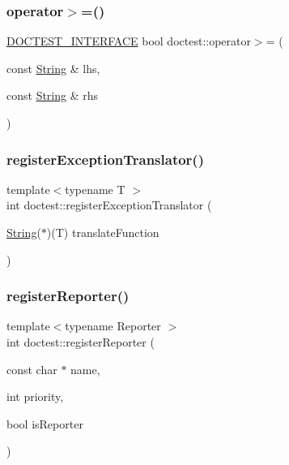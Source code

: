 \mbox{\label{namespacedoctest_ac32accb42e937cf870de2f6865ea236a}} 
\subsubsection{\texorpdfstring{operator$>$=()}{operator>=()}}
{\footnotesize\ttfamily \hyperlink{doctest_8h_a9c16ffc635ec47f07797d21ede26b1a5}{D\+O\+C\+T\+E\+S\+T\+\_\+\+I\+N\+T\+E\+R\+F\+A\+CE} bool doctest\+::operator$>$= (\begin{DoxyParamCaption}\item[{const \hyperlink{classdoctest_1_1_string}{String} \&}]{lhs,  }\item[{const \hyperlink{classdoctest_1_1_string}{String} \&}]{rhs }\end{DoxyParamCaption})}

\mbox{\label{namespacedoctest_a8e23e6bb4c6982688652060dbe41385d}} 
\subsubsection{\texorpdfstring{register\+Exception\+Translator()}{registerExceptionTranslator()}}
{\footnotesize\ttfamily template$<$typename T $>$ \\
int doctest\+::register\+Exception\+Translator (\begin{DoxyParamCaption}\item[{\hyperlink{classdoctest_1_1_string}{String}($\ast$)(T)}]{translate\+Function }\end{DoxyParamCaption})}

\mbox{\label{namespacedoctest_a9e878a811f7bf0a615b3a39de3004673}} 
\subsubsection{\texorpdfstring{register\+Reporter()}{registerReporter()}}
{\footnotesize\ttfamily template$<$typename Reporter $>$ \\
int doctest\+::register\+Reporter (\begin{DoxyParamCaption}\item[{const char $\ast$}]{name,  }\item[{int}]{priority,  }\item[{bool}]{is\+Reporter }\end{DoxyParamCaption})}

